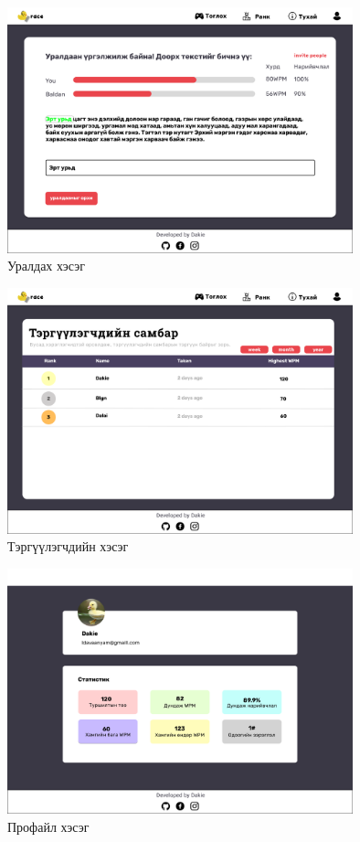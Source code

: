 \begin{figure}[h]
	\centering
	\includegraphics[width=10cm]{images/interfaces/ver1/playpage.png}
	\caption{Уралдах хэсэг}
	\label{fig:interface-v1-02}
\end{figure}

\begin{figure}[h]
	\centering
	\includegraphics[width=10cm]{images/interfaces/ver1/leaderboard.png}
	\caption{Тэргүүлэгчдийн хэсэг}
	\label{fig:interface-v1-03}
\end{figure}

\begin{figure}[h]
	\centering
	\includegraphics[width=10cm]{images/interfaces/ver1/profilepage.png}
	\caption{Профайл хэсэг}
	\label{fig:interface-v1-04}
\end{figure}


